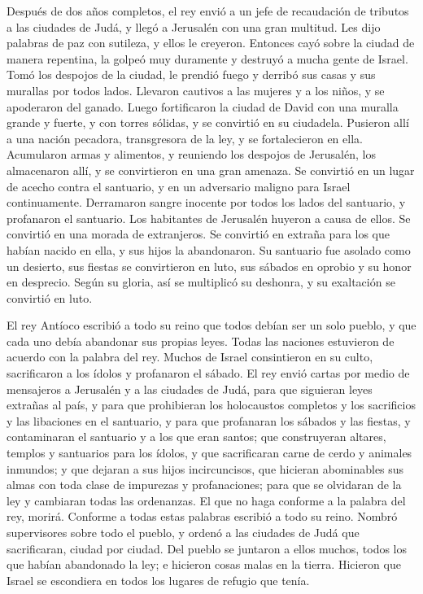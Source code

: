  Después de dos años completos, el rey envió a un jefe de
recaudación de tributos a las ciudades de Judá, y llegó a Jerusalén con
una gran multitud.  Les dijo palabras de paz con
sutileza, y ellos le creyeron. Entonces cayó sobre la ciudad de manera
repentina, la golpeó muy duramente y destruyó a mucha gente de Israel.
 Tomó los despojos de la ciudad, le prendió fuego y
derribó sus casas y sus murallas por todos lados. 
Llevaron cautivos a las mujeres y a los niños, y se apoderaron del
ganado.  Luego fortificaron la ciudad de David con una
muralla grande y fuerte, y con torres sólidas, y se convirtió en su
ciudadela.  Pusieron allí a una nación pecadora,
transgresora de la ley, y se fortalecieron en ella. 
Acumularon armas y alimentos, y reuniendo los despojos de Jerusalén, los
almacenaron allí, y se convirtieron en una gran amenaza. 
Se convirtió en un lugar de acecho contra el santuario, y en un
adversario maligno para Israel continuamente.  Derramaron
sangre inocente por todos los lados del santuario, y profanaron el
santuario.  Los habitantes de Jerusalén huyeron a causa
de ellos. Se convirtió en una morada de extranjeros. Se convirtió en
extraña para los que habían nacido en ella, y sus hijos la abandonaron.
 Su santuario fue asolado como un desierto, sus fiestas
se convirtieron en luto, sus sábados en oprobio y su honor en desprecio.
 Según su gloria, así se multiplicó su deshonra, y su
exaltación se convirtió en luto.

 El rey Antíoco escribió a todo su reino que todos debían
ser un solo pueblo,  y que cada uno debía abandonar sus
propias leyes. Todas las naciones estuvieron de acuerdo con la palabra
del rey.  Muchos de Israel consintieron en su culto,
sacrificaron a los ídolos y profanaron el sábado.  El rey
envió cartas por medio de mensajeros a Jerusalén y a las ciudades de
Judá, para que siguieran leyes extrañas al país,  y para
que prohibieran los holocaustos completos y los sacrificios y las
libaciones en el santuario, y para que profanaran los sábados y las
fiestas,  y contaminaran el santuario y a los que eran
santos;  que construyeran altares, templos y santuarios
para los ídolos, y que sacrificaran carne de cerdo y animales inmundos;
 y que dejaran a sus hijos incircuncisos, que hicieran
abominables sus almas con toda clase de impurezas y profanaciones;
 para que se olvidaran de la ley y cambiaran todas las
ordenanzas.  El que no haga conforme a la palabra del
rey, morirá.  Conforme a todas estas palabras escribió a
todo su reino. Nombró supervisores sobre todo el pueblo, y ordenó a las
ciudades de Judá que sacrificaran, ciudad por ciudad. 
Del pueblo se juntaron a ellos muchos, todos los que habían abandonado
la ley; e hicieron cosas malas en la tierra.  Hicieron
que Israel se escondiera en todos los lugares de refugio que tenía.

